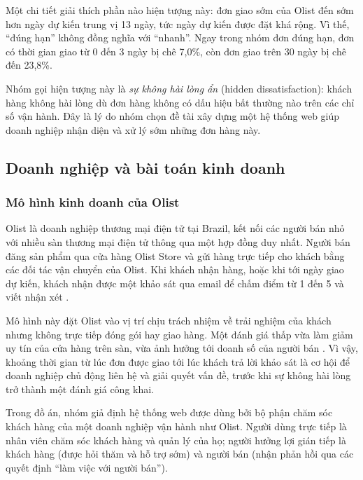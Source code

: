 Một chi tiết giải thích phần nào hiện tượng này: đơn giao sớm của Olist đến sớm hơn ngày
dự kiến trung vị 13 ngày, tức ngày dự kiến được đặt khá rộng. Vì thế, ``đúng hạn'' không
đồng nghĩa với ``nhanh''. Ngay trong nhóm đơn đúng hạn, đơn có thời gian giao từ 0 đến 3
ngày bị chê 7,0\%, còn đơn giao trên 30 ngày bị chê đến 23,8\%.

Nhóm gọi hiện tượng này là \textit{sự không hài lòng ẩn} (hidden dissatisfaction): khách
hàng không hài lòng dù đơn hàng không có dấu hiệu bất thường nào trên các chỉ số vận hành.
Đây là lý do nhóm chọn đề tài xây dựng một hệ thống web giúp doanh nghiệp nhận diện và xử
lý sớm những đơn hàng này.

\subsection{Doanh nghiệp và bài toán kinh doanh}

\subsubsection{Mô hình kinh doanh của Olist}

Olist là doanh nghiệp thương mại điện tử tại Brazil, kết nối các người bán nhỏ với nhiều sàn
thương mại điện tử thông qua một hợp đồng duy nhất. Người bán đăng sản phẩm qua cửa hàng Olist
Store và gửi hàng trực tiếp cho khách bằng các đối tác vận chuyển của Olist. Khi khách nhận hàng,
hoặc khi tới ngày giao dự kiến, khách nhận được một khảo sát qua email để chấm điểm từ 1 đến 5 và
viết nhận xét \parencite{olist2018}.

Mô hình này đặt Olist vào vị trí chịu trách nhiệm về trải nghiệm của khách nhưng không trực tiếp
đóng gói hay giao hàng. Một đánh giá thấp vừa làm giảm uy tín của cửa hàng trên sàn, vừa ảnh hưởng
tới doanh số của người bán \parencite{deshpande2023}. Vì vậy, khoảng thời gian từ lúc đơn được giao
tới lúc khách trả lời khảo sát là cơ hội để doanh nghiệp chủ động liên hệ và giải quyết vấn đề, trước
khi sự không hài lòng trở thành một đánh giá công khai.

Trong đồ án, nhóm giả định hệ thống web được dùng bởi bộ phận chăm sóc khách hàng của một doanh nghiệp
vận hành như Olist. Người dùng trực tiếp là nhân viên chăm sóc khách hàng và quản lý của họ; người
hưởng lợi gián tiếp là khách hàng (được hỏi thăm và hỗ trợ sớm) và người bán (nhận phản hồi qua các
quyết định ``làm việc với người bán'').

